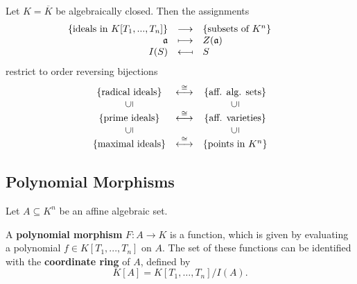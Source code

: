 	\begin{corollary}[IV-Correspondence]
		Let $K = \overline{K}$ be algebraically closed. Then the assignments
		\begin{equation*}
			\hspace{-.75cm}\begin{array}{rcl}
				\{\text{ideals in }K[T_1,...,T_n]\} & \longrightarrow & \{\text{subsets of }K^n\}\\
				\mathfrak{a} & \longmapsto & Z(\mathfrak{a})\\
				I(S) & \longmapsfrom & S
			\end{array}
		\end{equation*}
		restrict to order reversing bijections
		\begin{equation*}
			\begin{array}{ccc}
				\{\text{radical ideals}\} & \overset{\isom}{\longleftrightarrow} & \{\text{aff. alg. sets}\}\\
				\rotatebox[origin=c]{90}{$\subseteq$}&&\rotatebox[origin=c]{90}{$\subseteq$}\\
				\{\text{prime ideals}\} & \overset{\isom}{\longleftrightarrow} & \{\text{aff. varieties}\}\\
				\rotatebox[origin=c]{90}{$\subseteq$}&&\rotatebox[origin=c]{90}{$\subseteq$}\\
				\{\text{maximal ideals}\} & \overset{\isom}{\longleftrightarrow} & \{\text{points in }K^n\}
			\end{array}
		\end{equation*}
	\end{corollary}

	\subsection{Polynomial Morphisms}

	\begin{definition}
		Let $A \subseteq K^n$ be an affine algebraic set. 

		A \textbf{polynomial morphism} $F:A \longrightarrow K$ is a function, which is given by evaluating a polynomial $f \in K[T_1,...,T_n]$ on $A$. The set of these functions can be identified with the \textbf{coordinate ring} of $A$, defined by 
		\begin{equation*}
			K[A] = K[T_1, \dots, T_n] / I(A).
		\end{equation*}
	\end{definition}

